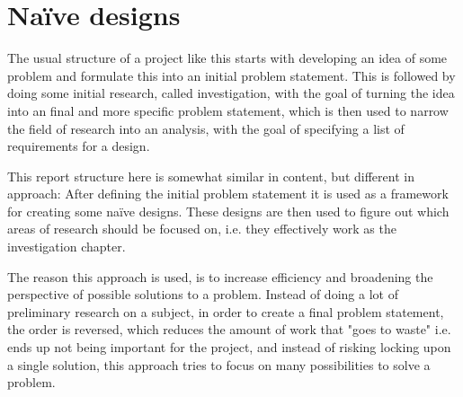 \section{Naïve designs}
The usual structure of a project like this starts with developing an idea of some problem and formulate this into an initial problem statement. This is followed by doing some initial research, called investigation, with the goal of turning the idea into an final and more specific problem statement, which is then used to narrow the field of research into an analysis, with the goal of specifying a list of requirements for a design.

This report structure here is somewhat similar in content, but different in approach:
After defining the initial problem statement it is used as a framework for creating some naïve designs. These designs are then used to figure out which areas of research should be focused on, i.e. they effectively work as the investigation chapter.
\bigskip

The reason this approach is used, is to increase efficiency and broadening the perspective of possible solutions to a problem. Instead of doing a lot of preliminary research on a subject, in order to create a final problem statement, the order is reversed, which reduces the amount of work that "goes to waste" i.e. ends up not being important for the project, and instead of risking locking upon a single solution, this approach tries to focus on many possibilities to solve a problem.


